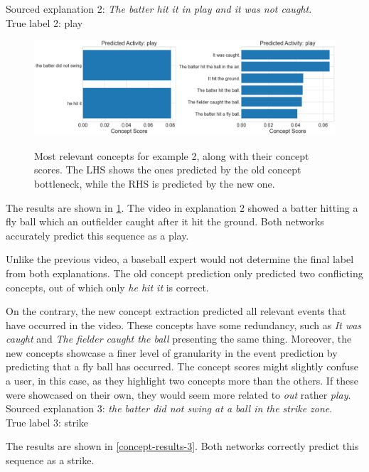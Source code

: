 Sourced explanation 2: \emph{The batter hit it in play and it was not caught.} \\
True label 2: play

\begin{figure}[h]
\caption{Most relevant concepts for example 2, along with their concept scores. The LHS shows the ones predicted by the old concept bottleneck, while the RHS is predicted by the new one.}
\centering
\includegraphics[width=\textwidth]{concept-bottleneck-pipeline/expalantions_concepts2.png}
\label{concepts-results-2}
\end{figure}

The results are shown in \ref{concepts-results-2}.
The video in explanation 2 showed a batter hitting a fly ball which an outfielder caught after it hit the ground.
Both networks accurately predict this sequence as a play.

Unlike the previous video, a baseball expert would not determine the final label from both explanations.
The old concept prediction only predicted two conflicting concepts, out of which only \emph{he hit it} is correct.

On the contrary, the new concept extraction predicted all relevant events that have occurred in the video.
These concepts have some redundancy, such as \emph{It was caught} and \emph{The fielder caught the ball} presenting the same thing.
Moreover, the new concepts showcase a finer level of granularity in the event prediction by predicting that a fly ball has occurred. 
The concept scores might slightly confuse a user, in this case, as they highlight two concepts more than the others. 
If these were showcased on their own, they would seem more related to \textit{out} rather \emph{play}. \\

Sourced explanation 3: \emph{the batter did not swing at a ball in the strike zone}. \\
True label 3: strike

The results are shown in \ref{concept-results-3}.
Both networks correctly predict this sequence as a strike.

